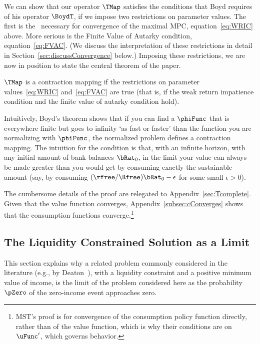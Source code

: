 \documentclass[ProjectDLO]{subfiles}
\begin{document}
\hypertarget{Contraction-Conditions}{}

We can show that our operator $\TMap$ satisfies the conditions that Boyd requires of his operator $\BoydT$, if we impose two restrictions on parameter values.  The first is the \WRIC~necessary for convergence of the maximal MPC, equation~\eqref{eq:WRIC} above.  More serious is the Finite Value of Autarky condition, equation~\eqref{eq:FVAC}.  (We discuss the interpretation of these restrictions in detail in Section~\ref{sec:discussConvergence} below.)  Imposing these restrictions, we are now in position to state the central theorem of the paper.

\hypertarget{MainTheorem}{}
\setcounter{theorem}{0}
\begin{theorem}\label{thm:contmap}
  $\TMap$ is a contraction mapping if the restrictions on parameter values~\eqref{eq:WRIC} and~\eqref{eq:FVAC} are true (that is, if the weak return impatience condition and the finite value of autarky condition hold).
\end{theorem}

Intuitively, Boyd's theorem shows that if you can find a $\phiFunc$ that is everywhere finite but goes to infinity `as fast or faster' than the function you are normalizing with $\phiFunc$, the normalized problem defines a contraction mapping.  The intuition for the {\FVAC} condition is that, with an infinite horizon, with any initial amount of bank balances $\bRat_{0}$, in the limit your value can always be made greater than you would get by consuming exactly the sustainable amount (say, by consuming $(\rfree/\Rfree)\bRat_{0}-\epsilon$ for some small $\epsilon>0$).

The cumbersome details of the proof are relegated to Appendix~\ref{sec:Tcomplete}.  Given that the value function converges, Appendix~\ref{subsec:cConverges} shows that the consumption functions converge.\footnote{MST's proof is for convergence of the consumption policy function directly, rather than of the value function, which is why their conditions are on $\uFunc^{\prime}$, which governs behavior.}

\hypertarget{The-Liquidity-Constrained-Solution-as-a-Limit}{}
\subsection{The Liquidity Constrained Solution as a Limit}\label{sec:deatonIsLimit}

This section explains why a related problem commonly considered in the literature (e.g., by Deaton~\citeyearpar{deatonLiqConstr}), with a liquidity constraint and a positive minimum value of income, is the limit of the problem considered here as the probability $\pZero$ of the zero-income event approaches zero.
\end{document}
